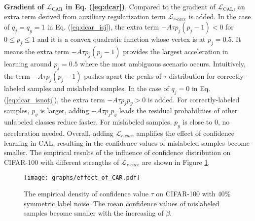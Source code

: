 \documentclass{article}
\begin{document}
\textbf{Gradient of $\mathcal{L}_\text{CAR}$ in Eq. (\ref{eq:dcar})}. Compared to the gradient of $\mathcal{L}_\text{CAL}$, an extra term derived from auxiliary regularization term $\mathcal{L}_{r\text{-}cace}$ is added. In the case of $q_{j}=q_{y}=1$ in Eq. (\ref{eq:dcar_isj}), the extra term $-A\tau p_{j}(p_{j}-1) < 0$ for $0 \le p_{j} \le 1$ and it is a convex quadratic function whose vertex is at $p_{j}=0.5$. It means the extra term $-A\tau p_{j}(p_{j}-1)$ provides the largest acceleration in learning around $p_{j}=0.5$ where the most ambiguous scenario occurs. Intuitively, the term $-A\tau p_{j}(p_{j}-1)$ pushes apart the peaks of $\tau$ distribution for correctly-labeled samples and mislabeled samples. In the case of $q_{j}=0$ in Eq. (\ref{eq:dcar_isnotj}), the extra term $-A\tau p_{j}p_{y} > 0$ is added. For correctly-labeled samples, $p_{y}$ is larger, adding $-A\tau p_{j}p_{y}$ leads the residual probabilities of other unlabeled classes reduce faster. For mislabeled samples, $p_{y}$ is close to 0, no acceleration needed. Overall, adding $\mathcal{L}_{r\text{-}cace}$ amplifies the effect of confidence learning in CAL, resulting in the confidence values of mislabeled samples become smaller. The empirical results of the influence of confidence distribution on CIFAR-100 with different strengths of $\mathcal{L}_{r\text{-}cace}$ are shown in Figure \ref{fig:effect_of_CAR}. 





\begin{figure}[t]
	\begin{center}
		\texttt{[image: graphs/effect\_of\_CAR.pdf]}
	\end{center}
	\caption{The empirical density of confidence value $\tau$ on CIFAR-100 with 40\% symmetric label noise. The mean confidence values of mislabeled samples become smaller with the increasing of $\beta$.}
	\label{fig:effect_of_CAR}
	\vspace{-0.5em}
\end{figure}
\end{document}
